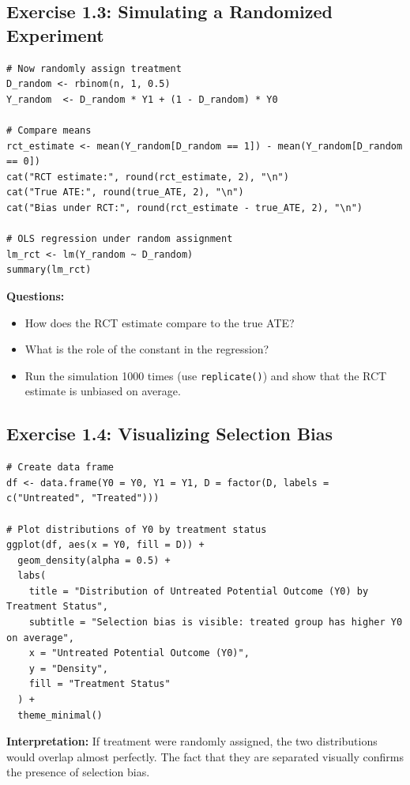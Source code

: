\subsection{Exercise 1.3: Simulating a Randomized Experiment}

\begin{lstlisting}
# Now randomly assign treatment
D_random <- rbinom(n, 1, 0.5)
Y_random  <- D_random * Y1 + (1 - D_random) * Y0

# Compare means
rct_estimate <- mean(Y_random[D_random == 1]) - mean(Y_random[D_random == 0])
cat("RCT estimate:", round(rct_estimate, 2), "\n")
cat("True ATE:", round(true_ATE, 2), "\n")
cat("Bias under RCT:", round(rct_estimate - true_ATE, 2), "\n")

# OLS regression under random assignment
lm_rct <- lm(Y_random ~ D_random)
summary(lm_rct)
\end{lstlisting}

\textbf{Questions:}
\begin{itemize}
\item How does the RCT estimate compare to the true ATE?
\item What is the role of the constant in the regression?
\item Run the simulation 1000 times (use \texttt{replicate()}) and show that the RCT estimate is unbiased on average.
\end{itemize}

\subsection{Exercise 1.4: Visualizing Selection Bias}

\begin{lstlisting}
# Create data frame
df <- data.frame(Y0 = Y0, Y1 = Y1, D = factor(D, labels = c("Untreated", "Treated")))

# Plot distributions of Y0 by treatment status
ggplot(df, aes(x = Y0, fill = D)) +
  geom_density(alpha = 0.5) +
  labs(
    title = "Distribution of Untreated Potential Outcome (Y0) by Treatment Status",
    subtitle = "Selection bias is visible: treated group has higher Y0 on average",
    x = "Untreated Potential Outcome (Y0)",
    y = "Density",
    fill = "Treatment Status"
  ) +
  theme_minimal()
\end{lstlisting}

\textbf{Interpretation:} If treatment were randomly assigned, the two distributions would overlap almost perfectly. The fact that they are separated visually confirms the presence of selection bias.

